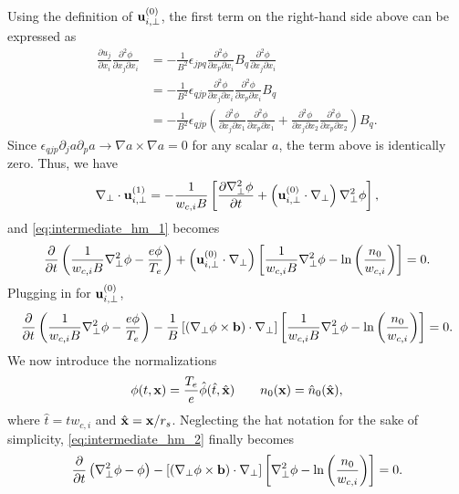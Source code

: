 \documentclass[oneside,a4paper,11pt]{report}
\begin{document}
Using the definition of $\mathbf{u}_{i,\perp}^{(0)}$, the first term on the right-hand side above can be expressed as
\begin{align}
    \frac{\partial u_j}{\partial x_i} \frac{\partial^2 \phi}{\partial x_j \partial x_i} &= -\frac{1}{B^2} \epsilon_{jpq} \frac{\partial^2 \phi}{\partial x_p \partial x_i} B_q \frac{\partial^2 \phi}{\partial x_j \partial x_i} \nonumber \\
    &= -\frac{1}{B^2} \epsilon_{qjp} \frac{\partial^2 \phi}{\partial x_j \partial x_i} \frac{\partial^2 \phi}{\partial x_p \partial x_i} B_q  \nonumber \\
    &= -\frac{1}{B^2} \epsilon_{qjp} \left ( \frac{\partial^2 \phi}{\partial x_j \partial x_1} \frac{\partial^2 \phi}{\partial x_p \partial x_1} + \frac{\partial^2 \phi}{\partial x_j \partial x_2} \frac{\partial^2 \phi}{\partial x_p \partial x_2}  \right ) B_q.
\end{align}
Since $\epsilon_{qjp} \partial_j a \partial_p a \to \nabla a \times \nabla a = 0$ for any scalar $a$, the term above is identically zero. Thus, we have
\begin{equation}
    \nabla_\perp \cdot \mathbf{u}_{i,\perp}^{(1)} = -\frac{1}{w_{c,i} B} \left [ \frac{\partial \nabla_\perp^2 \phi}{\partial t} + \left ( \mathbf{u}_{i,\perp}^{(0)} \cdot \nabla_\perp \right ) \nabla_\perp^2 \phi \right ],
\end{equation}
and \cref{eq:intermediate_hm_1} becomes
\begin{equation}
   \frac{\partial}{\partial t}\left ( \frac{1}{w_{c,i} B}\nabla_\perp^2 \phi - \frac{e \phi}{T_e} \right ) + \left (\mathbf{u}_{i,\perp}^{(0)} \cdot \nabla_\perp \right) \left [ \frac{1}{w_{c,i} B} \nabla_\perp^2 \phi - \ln \left( \frac{n_0}{w_{c,i}} \right) \right] = 0.
\end{equation}
Plugging in for $\mathbf{u}_{i,\perp}^{(0)}$,
\begin{equation}
\label{eq:intermediate_hm_2}
   \frac{\partial}{\partial t}\left ( \frac{1}{w_{c,i} B}\nabla_\perp^2 \phi - \frac{e \phi}{T_e} \right ) - \frac{1}{B} \left [ \left( \nabla_\perp \phi \times \mathbf{b} \right) \cdot \nabla_\perp \right] \left [ \frac{1}{w_{c,i} B} \nabla_\perp^2 \phi - \ln \left ( \frac{n_0}{w_{c,i}} \right) \right ] = 0.
\end{equation}
We now introduce the normalizations
\begin{equation}
    \phi(t,\mathbf{x}) = \frac{T_e}{e} \hat{\phi}(\hat{t},\hat{\mathbf{x}}) \qquad n_0(\mathbf{x}) = \hat{n}_0(\hat{\mathbf{x}}),
\end{equation}
where $\hat{t} = t w_{c,i}$ and $\hat{\mathbf{x}} = \mathbf{x} / r_s$. Neglecting the hat notation for the sake of simplicity, \cref{eq:intermediate_hm_2} finally becomes
\begin{equation}
    \label{eq:hasegawa_mima}
   \frac{\partial}{\partial t}\left ( \nabla_\perp^2 \phi - \phi \right ) - \left [ \left( \nabla_\perp \phi \times \mathbf{b} \right) \cdot \nabla_\perp \right] \left [ \nabla_\perp^2 \phi - \ln \left( \frac{n_0}{w_{c,i}} \right) \right ] = 0.
\end{equation}
\end{document}
